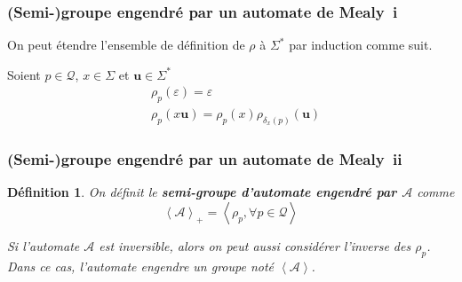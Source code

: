 \documentclass[11pt]{beamer}
\newtheorem{defi}{Définition}
\begin{document}
\begin{frame}
  \frametitle{(Semi-)groupe engendré par un automate de Mealy~i}

  On peut étendre l'ensemble de définition de $\rho$ à $\Sigma^*$ par induction comme suit.

  Soient $p\in\mathcal{Q}$, $x\in\Sigma$ et $\textbf{u}\in\Sigma^*$
  \begin{align*}
    &\rho_p(\varepsilon)=\varepsilon \\
    &\rho_p(x\textbf{u})=\rho_p(x)\rho_{\delta_x(p)}(\textbf{u})
  \end{align*}


  \begin{figure}[!ht]
    \begin{center}
    \end{center}
  \end{figure}
\end{frame}

\begin{frame}
  \frametitle{(Semi-)groupe engendré par un automate de Mealy~ii}

  \begin{defi}
    On définit le \textbf{semi-groupe d'automate engendré par $\mathcal{A}$} comme
    \begin{equation*}
      \left<\mathcal{A}\right>_+=\left<\rho_p, \forall p\in\mathcal{Q}\right>
    \end{equation*}

    Si l'automate $\mathcal{A}$ est inversible, alors on peut aussi considérer l'inverse des $\rho_p$. Dans ce cas, l'automate engendre un groupe noté $\left<\mathcal{A}\right>$.

  \end{defi}
\end{frame}
\end{document}
